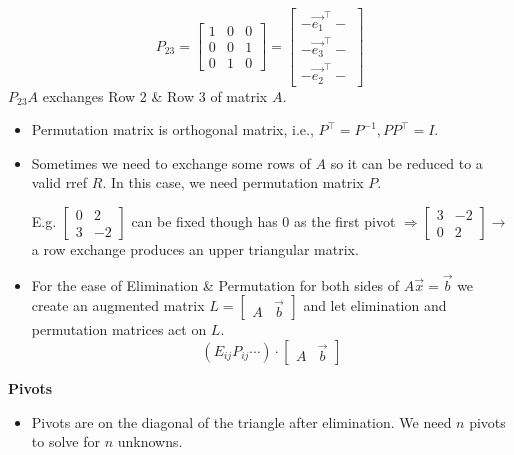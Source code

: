 \documentclass[13pt]{article}
\theoremstyle{definition}
\theoremstyle{remark}
\begin{document}
\begin{multicols}{2}
$$
P_{23}=\left[\begin{array}{lll}
1 & 0 & 0 \\
0 & 0 & 1 \\
0 & 1 & 0
\end{array}\right]=\left[\begin{array}{c}
-{\vec{e_1}}^{\top}- \\
-{\vec{e_3}}^{\top}- \\
-{\vec{e_2}}^{\top}-
\end{array}\right]
$$
$P_{23} A$ exchanges Row 2 \& Row 3 of matrix $A$.
\begin{itemize}
    \item Permutation matrix is orthogonal matrix, i.e., $P^\top = P^{-1}, PP^\top = I$.
    \item Sometimes we need to exchange some rows of $A$ so it can be reduced to a valid rref $R$. In this case, we need permutation matrix $P$.

E.g. $\begin{bmatrix}0 & 2 \\ 
3 & -2
\end{bmatrix}$ can be fixed though has 0 as the first pivot
$\Rightarrow\left[\begin{array}{cc}3 & -2 \\ 0 & 2\end{array}\right] \rightarrow$ a row exchange produces an upper triangular matrix.
\item For the ease of Elimination \& Permutation for both sides of $A \vec{x}=\vec{b}$ we create an augmented matrix $L = \begin{bmatrix}A & \vec{b}\end{bmatrix}$ and let elimination and permutation matrices act on $L$.
$$
\left(E_{i j} P_{i j} \cdots \right) \cdot\begin{bmatrix}A & \vec{b}\end{bmatrix}
$$
\end{itemize}

\textbf{Pivots}
\begin{itemize}
    \item Pivots are on the diagonal of the triangle after elimination.
We need $n$ pivots to solve for $n$ unknowns.
\end{itemize}

\end{multicols}

\headrule

\end{document}
